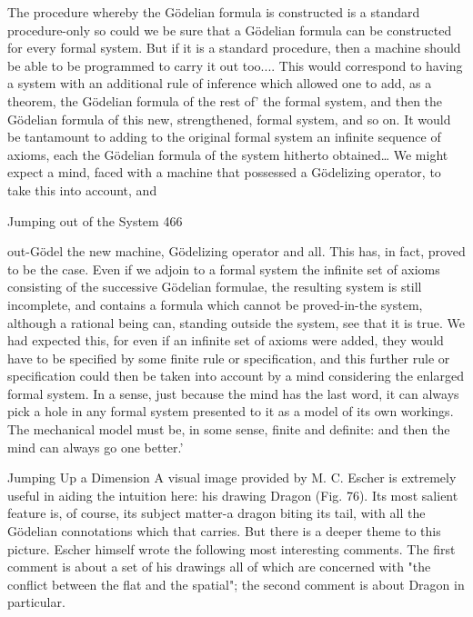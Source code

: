 {   The procedure whereby the Gödelian formula is constructed is a standard
   procedure-only so could we be sure that a Gödelian formula can be constructed for
   every formal system. But if it is a standard procedure, then a machine should be
   able to be programmed to carry it out too.... This would correspond to having a
   system with an additional rule of inference which allowed one to add, as a theorem,
   the Gödelian formula of the rest of' the formal system, and then the Gödelian
   formula of this new, strengthened, formal system, and so on. It would be
   tantamount to adding to the original formal system an infinite sequence of axioms,
   each the Gödelian formula of the system hitherto obtained… We might expect a
   mind, faced with a machine that possessed a Gödelizing operator, to take this into
   account, and



Jumping out of the System                                                                 466

   out-Gödel the new machine, Gödelizing operator and all. This has, in fact, proved
   to be the case. Even if we adjoin to a formal system the infinite set of axioms
   consisting of the successive Gödelian formulae, the resulting system is still
   incomplete, and contains a formula which cannot be proved-in-the system, although
   a rational being can, standing outside the system, see that it is true. We had
   expected this, for even if an infinite set of axioms were added, they would have to
   be specified by some finite rule or specification, and this further rule or
   specification could then be taken into account by a mind considering the enlarged
   formal system. In a sense, just because the mind has the last word, it can always
   pick a hole in any formal system presented to it as a model of its own workings.
   The mechanical model must be, in some sense, finite and definite: and then the
   mind can always go one better.'

                              Jumping Up a Dimension
A visual image provided by M. C. Escher is extremely useful in aiding the intuition here:
his drawing Dragon (Fig. 76). Its most salient feature is, of course, its subject matter-a
dragon biting its tail, with all the Gödelian connotations which that carries. But there is a
deeper theme to this picture. Escher himself wrote the following most interesting
comments. The first comment is about a set of his drawings all of which are concerned
with "the conflict between the flat and the spatial"; the second comment is about Dragon
in particular.

}
